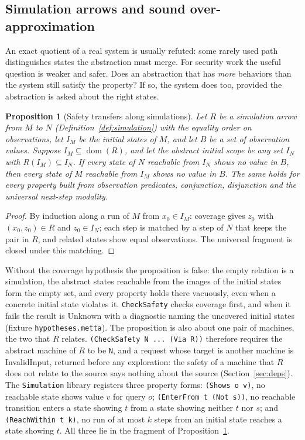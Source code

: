\documentclass[11pt]{article}
\newcommand{\code}[1]{\texttt{#1}}
\newcommand{\dom}{\operatorname{dom}}
\theoremstyle{definition}
\theoremstyle{plain}
\newtheorem{proposition}[definition]{Proposition}
\begin{document}
\subsection{Simulation arrows and sound over-approximation}\label{sec:simulation}

An exact quotient of a real system is usually refuted: some rarely used path distinguishes states the
abstraction must merge. For security work the useful question is weaker and safer. Does an
abstraction that has \emph{more} behaviors than the system still satisfy the property? If so, the
system does too, provided the abstraction is asked about the right states.

\begin{proposition}[Safety transfers along simulations]\label{prop:safety}
Let $R$ be a simulation arrow from $M$ to $N$ (Definition~\ref{def:simulation}) with the equality
order on observations, let $I_M$ be the initial states of $M$, and let $B$ be a set of observation
values. Suppose $I_M\subseteq\dom(R)$, and let the abstract initial scope be any set $I_N$ with
$R(I_M)\subseteq I_N$. If every state of $N$ reachable from $I_N$ shows no value in $B$, then every
state of $M$ reachable from $I_M$ shows no value in $B$. The same holds for every property built
from observation predicates, conjunction, disjunction and the universal next-step modality.
\end{proposition}

\begin{proof}
By induction along a run of $M$ from $x_0\in I_M$: coverage gives $z_0$ with $(x_0,z_0)\in R$ and
$z_0\in I_N$; each step is matched by a step of $N$ that keeps the pair in $R$, and related states
show equal observations. The universal fragment is closed under this matching.
\end{proof}

Without the coverage hypothesis the proposition is false: the empty relation is a simulation, the
abstract states reachable from the images of the initial states form the empty set, and every
property holds there vacuously, even when a concrete initial state violates it. \code{CheckSafety}
checks coverage first, and when it fails the result is Unknown with a diagnostic naming the
uncovered initial states (fixture \code{hypotheses.metta}). The proposition is also about one pair
of machines, the two that $R$ relates. \code{(CheckSafety N ... (Via R))} therefore requires the
abstract machine of $R$ to be \code{N}, and a request whose target is another machine is
InvalidInput, returned before any exploration: the safety of a machine that $R$ does not relate to
the source says nothing about the source (Section~\ref{sec:deps}). The \code{Simulation} library
registers three property forms: \code{(Shows o v)}, no reachable state shows value $v$ for query
$o$; \code{(EnterFrom t (Not s))}, no reachable transition enters a state showing $t$ from a state
showing neither $t$ nor $s$; and \code{(ReachWithin t k)}, no run of at most $k$ steps from an
initial state reaches a state showing $t$. All three lie in the fragment of
Proposition~\ref{prop:safety}.
\end{document}
